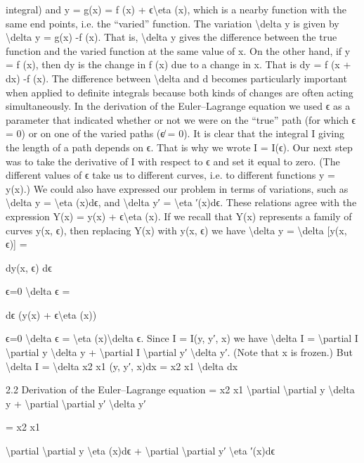 \begin{exercise}
integral) and y = g(x) = f (x) + ϵ\textbackslash{}eta (x), which is a nearby function with the
same end points, i.e. the ``varied'' function. The variation \textbackslash{}delta y is given by
\textbackslash{}delta y = g(x) -f (x).
That is, \textbackslash{}delta y gives the difference between the true function and the varied function at the same value of x. On the other hand, if y = f (x), then dy is the
change in f (x) due to a change in x. That is
dy = f (x + dx) -f (x).
The difference between \textbackslash{}delta  and d becomes particularly important when
applied to definite integrals because both kinds of changes are often acting
simultaneously.
In the derivation of the Euler--Lagrange equation we used ϵ as a parameter
that indicated whether or not we were on the ``true'' path (for which ϵ = 0)
or on one of the varied paths (ϵ̸ = 0). It is clear that the integral I giving
the length of a path depends on ϵ. That is why we wrote I = I(ϵ). Our next
step was to take the derivative of I with respect to ϵ and set it equal to zero.
(The different values of ϵ take us to different curves, i.e. to different functions
y = y(x).)
We could also have expressed our problem in terms of variations, such as
\textbackslash{}delta y = \textbackslash{}eta (x)dϵ,
and
\textbackslash{}delta y′ = \textbackslash{}eta ′(x)dϵ.
These relations agree with the expression Y(x) = y(x) + ϵ\textbackslash{}eta (x). If we recall
that Y(x) represents a family of curves y(x, ϵ), then replacing Y(x) with
y(x, ϵ) we have
\textbackslash{}delta y = \textbackslash{}delta [y(x, ϵ)] =

dy(x, ϵ)
dϵ

ϵ=0
\textbackslash{}delta ϵ =

dϵ (y(x) + ϵ\textbackslash{}eta (x))

ϵ=0
\textbackslash{}delta ϵ = \textbackslash{}eta (x)\textbackslash{}delta ϵ.
Since I = I(y, y′, x) we have
\textbackslash{}delta I = \textbackslash{}partial I
\textbackslash{}partial y \textbackslash{}delta y + \textbackslash{}partial I
\textbackslash{}partial y′ \textbackslash{}delta y′.
(Note that x is frozen.) But
\textbackslash{}delta I = \textbackslash{}delta
x2
x1
(y, y′, x)dx
=
x2
x1
\textbackslash{}delta dx

2.2
Derivation of the Euler--Lagrange equation
=
x2
x1
\textbackslash{}partial
\textbackslash{}partial y \textbackslash{}delta y + \textbackslash{}partial
\textbackslash{}partial y′ \textbackslash{}delta y′

=
x2
x1

\textbackslash{}partial
\textbackslash{}partial y \textbackslash{}eta (x)dϵ + \textbackslash{}partial
\textbackslash{}partial y′ \textbackslash{}eta ′(x)dϵ


\end{exercise}
